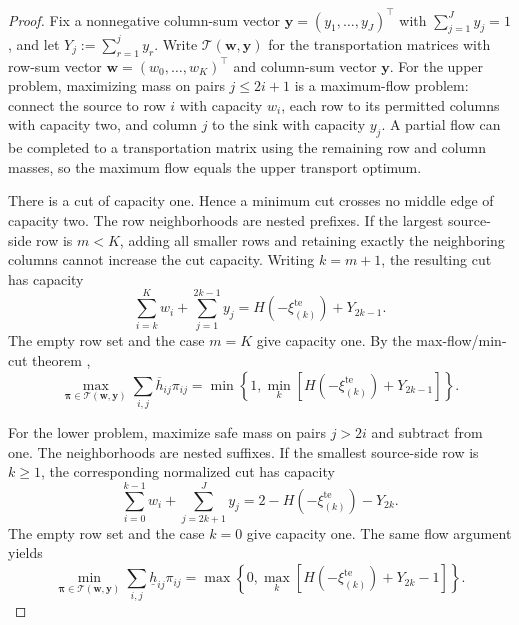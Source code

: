 \documentclass[review,11pt,3p,authoryear,nopreprintline]{elsarticle}
\begin{document}
\begin{proof}
  Fix a nonnegative column-sum vector $\bm y=(y_1,\ldots,y_J)^\top$ with $\sum_{j=1}^J y_j=1$, and let $Y_j:=\sum_{r=1}^j y_r$. Write $\mathcal T(\bm w,\bm y)$ for the transportation matrices with row-sum vector $\bm w=(w_0,\ldots,w_K)^\top$ and column-sum vector $\bm y$. For the upper problem, maximizing mass on pairs $j\le2i+1$ is a maximum-flow problem: connect the source to row $i$ with capacity $w_i$, each row to its permitted columns with capacity two, and column $j$ to the sink with capacity $y_j$. A partial flow can be completed to a transportation matrix using the remaining row and column masses, so the maximum flow equals the upper transport optimum.

  There is a cut of capacity one. Hence a minimum cut crosses no middle edge of capacity two. The row neighborhoods are nested prefixes. If the largest source-side row is $m<K$, adding all smaller rows and retaining exactly the neighboring columns cannot increase the cut capacity. Writing $k=m+1$, the resulting cut has capacity
  \[
    \sum_{i=k}^K w_i+\sum_{j=1}^{2k-1}y_j
    =H\left(-\xi_{(k)}^{\mathrm{te}}\right)+Y_{2k-1}.
  \]
  The empty row set and the case $m=K$ give capacity one. By the max-flow/min-cut theorem \citep{F.F56},
  \begin{equation}
    \max_{\bm\pi\in\mathcal T(\bm w,\bm y)}
      \sum_{i,j}\overline h_{ij}\pi_{ij}
    =\min\left\{1,\min_k[H\left(-\xi_{(k)}^{\mathrm{te}}\right)+Y_{2k-1}]\right\}.
    \label{eq-fixed-column-upper}
  \end{equation}

  For the lower problem, maximize safe mass on pairs $j>2i$ and subtract from one. The neighborhoods are nested suffixes. If the smallest source-side row is $k\ge1$, the corresponding normalized cut has capacity
  \[
    \sum_{i=0}^{k-1}w_i+\sum_{j=2k+1}^Jy_j
    =2-H\left(-\xi_{(k)}^{\mathrm{te}}\right)-Y_{2k}.
  \]
  The empty row set and the case $k=0$ give capacity one. The same flow argument yields
  \begin{equation}
    \min_{\bm\pi\in\mathcal T(\bm w,\bm y)}
      \sum_{i,j}\underline h_{ij}\pi_{ij}
    =\max\left\{0,\max_k[H\left(-\xi_{(k)}^{\mathrm{te}}\right)+Y_{2k}-1]\right\}.
    \label{eq-fixed-column-lower}
  \end{equation}


\end{proof}
\end{document}
